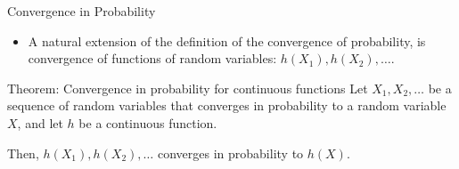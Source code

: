 \begin{frame}[allowframebreaks]{Convergence in Probability}
  
  \begin{itemize}
    \item A natural extension of the definition of the convergence of probability, is convergence of functions of random variables: $h(X_1), h(X_2), \ldots$. 
  \end{itemize}
  
  \begin{block}{Theorem: Convergence in probability for continuous functions}
    Let $X_1, X_2, \ldots$ be a sequence of random variables that converges in probability to a random variable $X$, and let $h$ be a continuous function.
    
    Then, $h(X_1), h(X_2), \ldots$ converges in probability to $h(X)$. 
  \end{block}
  
\end{frame}

